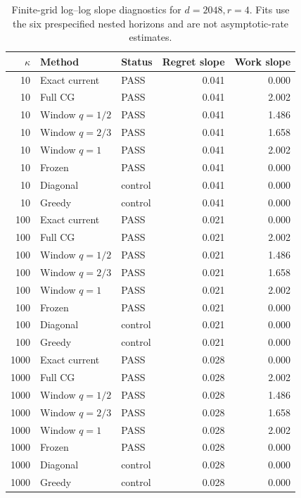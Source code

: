 \begin{table}[p]
\centering\scriptsize
\begin{tabular}{rllrr}
\toprule
$\kappa$ & Method & Status & Regret slope & Work slope \\
\midrule
10 & Exact current & PASS & 0.041 & 0.000 \\
10 & Full CG & PASS & 0.041 & 2.002 \\
10 & Window $q=1/2$ & PASS & 0.041 & 1.486 \\
10 & Window $q=2/3$ & PASS & 0.041 & 1.658 \\
10 & Window $q=1$ & PASS & 0.041 & 2.002 \\
10 & Frozen & PASS & 0.041 & 0.000 \\
10 & Diagonal & control & 0.041 & 0.000 \\
10 & Greedy & control & 0.041 & 0.000 \\
100 & Exact current & PASS & 0.021 & 0.000 \\
100 & Full CG & PASS & 0.021 & 2.002 \\
100 & Window $q=1/2$ & PASS & 0.021 & 1.486 \\
100 & Window $q=2/3$ & PASS & 0.021 & 1.658 \\
100 & Window $q=1$ & PASS & 0.021 & 2.002 \\
100 & Frozen & PASS & 0.021 & 0.000 \\
100 & Diagonal & control & 0.021 & 0.000 \\
100 & Greedy & control & 0.021 & 0.000 \\
1000 & Exact current & PASS & 0.028 & 0.000 \\
1000 & Full CG & PASS & 0.028 & 2.002 \\
1000 & Window $q=1/2$ & PASS & 0.028 & 1.486 \\
1000 & Window $q=2/3$ & PASS & 0.028 & 1.658 \\
1000 & Window $q=1$ & PASS & 0.028 & 2.002 \\
1000 & Frozen & PASS & 0.028 & 0.000 \\
1000 & Diagonal & control & 0.028 & 0.000 \\
1000 & Greedy & control & 0.028 & 0.000 \\
\bottomrule
\end{tabular}
\caption{Finite-grid log--log slope diagnostics for $d=2048,r=4$.  Fits use the six prespecified nested horizons and are not asymptotic-rate estimates.}
\label{tab:certified-scaling-fits-7}
\end{table}

